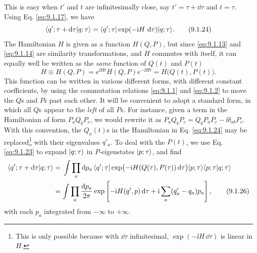 This is easy when $t'$ and $t$ are infinitesimally close, say
$t'=\tau+\dd\tau$ and $t=\tau$. Using Eq. \eqref{eq:9.1.17}, we have
\begin{equation}
  \langle q';\tau+\mathop{}\!\mathrm{d}\tau | q;\tau\rangle
  =\langle q';\tau\rvert\exp(-\mathrm{i} H\,\mathop{}\!\mathrm{d}\tau)\lvert q;\tau\rangle.
  \tag{9.1.24}\label{eq:9.1.24}
\end{equation}
The Hamiltonian $H$ is given as a function $H(Q,P)$, but since \eqref{eq:9.1.13}
and \eqref{eq:9.1.14} are similarity transformations, and $H$ commutes with itself,
it can equally well be written as the \emph{same} function of $Q(t)$ and
$P(t)$
\begin{equation}
  H\equiv H(Q,P)=e^{\ii Ht}H(Q,P)e^{-\ii Ht}=H\bigl(Q(t),P(t)\bigr).
  \tag{9.1.25}\label{eq:9.1.25}
\end{equation}
This function can be written in various different forms, with different
constant coefficients, by using the commutation relations \eqref{eq:9.1.1} and
\eqref{eq:9.1.2} to move the $Q$s and $P$s past each other. It will be convenient to
adopt a standard form, in which all $Q$s appear to the \emph{left} of all
$P$s. For instance, given a term in the Hamiltonian of form $P_aQ_bP_c$,
we would rewrite it as $P_aQ_bP_c=Q_bP_aP_c-\ii\delta_{ab}P_c$. With this
convention, the $Q_a(t)$s in the Hamiltonian in Eq. \eqref{eq:9.1.24} may be
replaced\footnote{This is only possible because with $\dd\tau$ infinitesimal,
$\exp(-\ii H\,\dd\tau)$ is linear in $H$.} with their eigenvalues $q'_a$. To deal
with the $P(t)$, we use Eq. \eqref{eq:9.1.23} to expand $\lvert q;\tau\rangle$ in
$P$-eigenstates $\lvert p;\tau\rangle$, and find
\begin{align}
  \langle q';\tau+\mathop{}\!\mathrm{d}\tau | q;\tau\rangle
  &={}
  \int\prod_a \mathop{}\!\mathrm{d} p_a\,
  \langle q';\tau\rvert\exp\bigl(-\mathrm{i} H(Q(\tau),P(\tau))\mathop{}\!\mathrm{d}\tau\bigr)\lvert p;\tau\rangle
  \langle p;\tau | q;\tau\rangle
  \notag\\
  &=\int\prod_a\frac{\mathop{}\!\mathrm{d} p_a}{2\pi}
  \exp\left[-\mathrm{i} H(q',p)\mathop{}\!\mathrm{d}\tau+\mathrm{i}\sum_a(q'_a-q_a)p_a\right],
  \tag{9.1.26}\label{eq:9.1.26}
\end{align}
with each $p_a$ integrated from $-\infty$ to $+\infty$.

